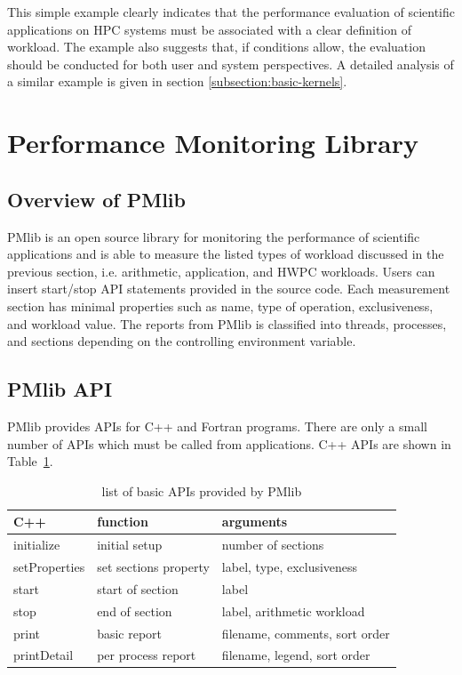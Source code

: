 \documentclass[conference]{IEEEtran}
\begin{document}
This simple example clearly indicates that the performance evaluation of
scientific applications on HPC systems must be associated with a clear
definition of workload. The example also suggests that, if conditions allow,
the evaluation should be conducted for both user and system perspectives.
A detailed analysis of a similar example is given in section
\ref{subsection:basic-kernels}.

\section{Performance Monitoring Library}
\label{section:PMlib}

%
\subsection {Overview of PMlib}
PMlib is an open source library for monitoring the performance of scientific
applications and is able to measure the listed types of workload discussed
in the previous section, i.e. arithmetic, application, and HWPC workloads.
Users can insert start/stop API statements provided in the source code.
Each measurement section has minimal properties such as name, type of operation,
exclusiveness, and workload value.
The reports from PMlib is classified into threads, processes, and sections
depending on the controlling environment variable.

%
\subsection{PMlib API}
PMlib provides APIs for C++ and Fortran programs.
There are only a small number of APIs which must be called from applications.
C++ APIs are shown in Table~\ref{tab:PMlib-API}. 

\begin{table}[tb]
\footnotesize
\caption{list of basic APIs provided by PMlib}
\label{tab:PMlib-API}
\begin{tabular}{l|l|l} \hline
C++	& function	&	arguments	\\ \hline \hline
initialize	& initial setup	& number of sections \\ %
setProperties	& set sections property	& label, type, exclusiveness \\ %
start	& start of section	& label \\ %
stop	& end of section	& label, arithmetic workload \\ %
print	& basic report	& filename, comments, sort order	\\ %
printDetail	& per process report	& filename, legend, sort order	\\ %
\end{tabular}
\end{table}
\end{document}
